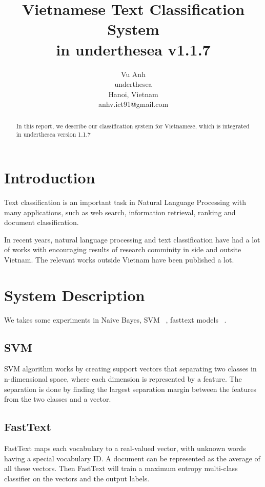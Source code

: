 \documentclass[11pt,a4paper]{article}
\title{Vietnamese Text Classification System \\ in underthesea v1.1.7}
\author{
Vu Anh\\
underthesea\\
Hanoi, Vietnam\\
anhv.ict91@gmail.com
}
\date{}
\begin{document}
\maketitle
\begin{abstract}
In this report, we describe our classification system for Vietnamese, which is integrated in underthesea version 1.1.7

\end{abstract}

\section{Introduction}

Text classification is an important task in Natural Language Processing with many applications, such as web search, information retrieval, ranking and document classification.

In recent years, natural language processing and text classification have had a lot of works with encouraging results of research comminity in side and outsite Vietnam. The relevant works outside Vietnam have been published a lot.

\section{System Description}

We takes some experiments in Naive Bayes, SVM ~\cite{Suykens1999}, fasttext models ~\cite{DBLP:journals/corr/JoulinGBM16}.

\subsection{SVM}

SVM algorithm works by creating support vectors that separating two classes in n-dimensional space, where each dimension is represented by a feature. The separation is done by finding the largest separation margin between  the features from the two classes and a vector.

\subsection{FastText}

FastText maps each vocabulary to a real-valued  vector, with unknown words having a special vocabulary ID. A document can be represented as the average of all these vectors. Then FastText will train a maximum entropy multi-class classifier  on the vectors and the output labels.
\end{document}
